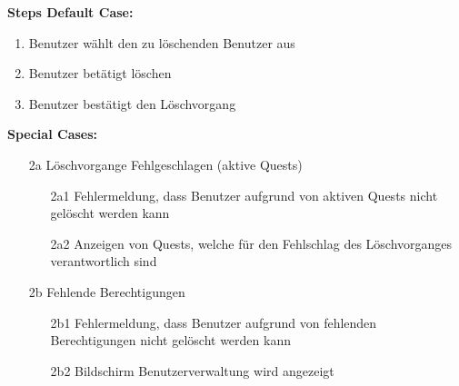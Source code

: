 \documentclass{article}
\begin{document}
    \textbf{Steps Default Case:} 
    \begin{enumerate}
        \item Benutzer wählt den zu löschenden Benutzer aus
        \item Benutzer betätigt löschen
        \item Benutzer bestätigt den Löschvorgang
    \end{enumerate}
\textbf{Special Cases:}
\begin{itemize}
    \item [2a] Löschvorgange Fehlgeschlagen (aktive Quests)
    \begin{itemize}
        \item [2a1] Fehlermeldung, dass Benutzer aufgrund von aktiven Quests nicht gelöscht werden kann
        \item [2a2] Anzeigen von Quests, welche für den Fehlschlag des Löschvorganges verantwortlich sind
    \end{itemize}
    \item [2b] Fehlende Berechtigungen
    \begin{itemize}
        \item [2b1] Fehlermeldung, dass Benutzer aufgrund von fehlenden Berechtigungen nicht gelöscht werden kann
        \item [2b2] Bildschirm Benutzerverwaltung wird angezeigt 
    \end{itemize}
\end{itemize}
\end{document}
